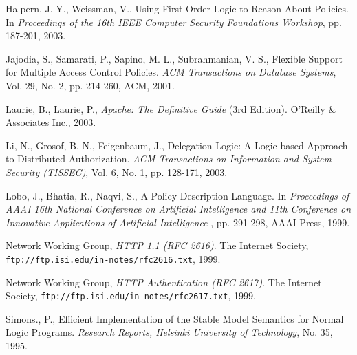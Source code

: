 \documentclass[global,twocolumn,final]{svjour}
\begin{document}
\begin{thebibliography}{5}
      Halpern, J. Y., Weissman, V.,
      Using First-Order Logic to Reason About Policies.
      In {\em Proceedings of the 16th IEEE Computer Security Foundations
      Workshop}, pp. 187-201, 2003.

      Jajodia, S., Samarati, P., Sapino, M. L., Subrahmanian, V. S.,
      Flexible Support for Multiple Access Control Policies.
      {\em ACM Transactions on Database Systems},
      Vol. 29, No. 2, pp. 214-260, ACM, 2001.

      Laurie, B., Laurie, P.,
      {\em Apache: The Definitive Guide} (3rd Edition).
      O'Reilly \& Associates Inc., 2003.

      Li, N., Grosof, B. N., Feigenbaum, J.,
      Delegation Logic: A Logic-based Approach to Distributed Authorization.
      {\em ACM Transactions on Information and System Security (TISSEC)},
      Vol. 6, No. 1, pp. 128-171, 2003.

      Lobo, J., Bhatia, R., Naqvi, S.,
      A Policy Description Language.
      In {\em Proceedings of AAAI 16th National Conference on Artificial
      Intelligence and 11th Conference on Innovative Applications of Artificial
      Intelligence }, pp. 291-298, AAAI Press, 1999.

      Network Working Group,
      {\em HTTP 1.1 (RFC 2616)}.
      The Internet Society,
      {\tt \scriptsize ftp://ftp.isi.edu/in-notes/rfc2616.txt},
      1999.

      Network Working Group,
      {\em HTTP Authentication (RFC 2617)}.
      The Internet Society,
      {\tt \scriptsize ftp://ftp.isi.edu/in-notes/rfc2617.txt},
      1999.

      Simons., P.,
      Efficient Implementation of the Stable Model Semantics for Normal Logic
      Programs.
      {\em Research Reports, Helsinki University of Technology},
      No. 35, 1995.
  \end{thebibliography}
\end{document}

